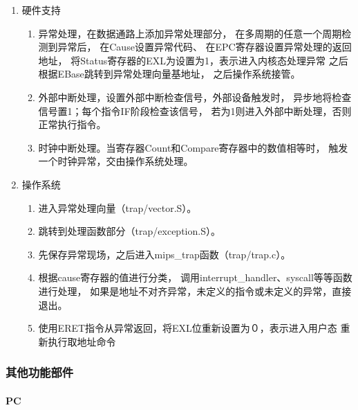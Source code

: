             \begin{enumerate}
            \item
            硬件支持
                \begin{enumerate}
                \item
                异常处理，在数据通路上添加异常处理部分，%
                在多周期的任意一个周期检测到异常后，%
                在Cause设置异常代码、
                在EPC寄存器设置异常处理的返回地址，
                将Status寄存器的EXL为设置为1，表示进入内核态处理异常
                之后根据EBase跳转到异常处理向量基地址，%
                之后操作系统接管。
                \item
                外部中断处理，设置外部中断检查信号，外部设备触发时，%
                异步地将检查信号置1；每个指令IF阶段检查该信号，%
                若为1则进入外部中断处理，否则正常执行指令。
                \item
                时钟中断处理。当寄存器Count和Compare寄存器中的数值相等时，%
                触发一个时钟异常，交由操作系统处理。
                \end{enumerate}
            \item
            操作系统
                \begin{enumerate}
                \item
                进入异常处理向量（trap/vector.S）。
                \item
                跳转到处理函数部分（trap/exception.S）。
                \item
                先保存异常现场，之后进入mips\_trap函数（trap/trap.c）。
                \item
                根据cause寄存器的值进行分类，%
                调用interrupt\_handler、syscall等等函数进行处理，%
                如果是地址不对齐异常，未定义的指令或未定义的异常，直接退出。
                \item
                使用ERET指令从异常返回，将EXL位重新设置为０，表示进入用户态
                重新执行取地址命令
                \end{enumerate}
            \end{enumerate}

        \subsubsection{其他功能部件}
            \paragraph{PC}
                \mbox{} \\ 

